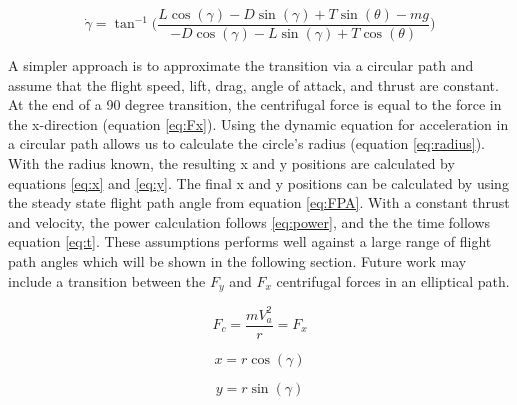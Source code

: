 \documentclass[10pt,english]{article}
\begin{document}
\begin{equation}
\label{eq:angledot}
\dot{\gamma} = \tan^{-1} \Bigg(\frac{L \cos(\gamma) - D \sin(\gamma) + T \sin(\theta)- m g}{-D \cos(\gamma) - L \sin(\gamma) + T \cos(\theta)}\Bigg)
\end{equation}

\vspace{10pt}
A simpler approach is to approximate the transition via a circular path and assume that the flight speed, lift, drag, angle of attack, and thrust are constant.  At the end of a 90 degree transition, the centrifugal force is equal to the force in the x-direction (equation \ref{eq:Fx}).  Using the dynamic equation for acceleration in a circular path allows us to calculate the circle's radius (equation \ref{eq:radius}).  With the radius known, the resulting x and y positions are calculated by equations \ref{eq:x} and \ref{eq:y}.  The final x and y positions can be calculated by using the steady state flight path angle from equation \ref{eq:FPA}.  With a constant thrust and velocity, the power calculation follows \ref{eq:power}, and the the time follows equation \ref{eq:t}. These assumptions performs well against a large range of flight path angles which will be shown in the following section.  Future work may include a transition between the $F_y$ and $F_x$ centrifugal forces in an elliptical path.

\begin{equation}
\label{eq:radius}
F_c = \frac{m V_a^2}{r} = F_x
\end{equation}

%




\begin{equation}
\label{eq:x}
x = r \cos(\gamma)
\end{equation}

\begin{equation}
\label{eq:y}
y = r \sin(\gamma)
\end{equation}
\end{document}
